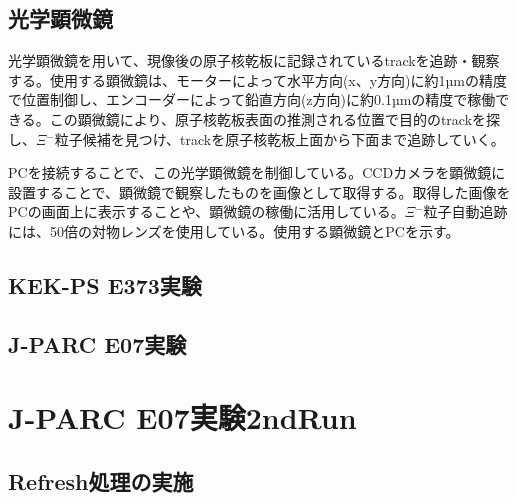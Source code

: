 \documentclass[12pt,a4paper]{jarticle}
\begin{document}
\subsection{光学顕微鏡}
光学顕微鏡を用いて、現像後の原子核乾板に記録されているtrackを追跡・観察する。使用する顕微鏡は、モーターによって水平方向(x、y方向)に約1µmの精度で位置制御し、エンコーダーによって鉛直方向(z方向)に約0.1µmの精度で稼働できる。この顕微鏡により、原子核乾板表面の推測される位置で目的のtrackを探し、$\Xi$$^-$粒子候補を見つけ、trackを原子核乾板上面から下面まで追跡していく。\par
PCを接続することで、この光学顕微鏡を制御している。CCDカメラを顕微鏡に設置することで、顕微鏡で観察したものを画像として取得する。取得した画像をPCの画面上に表示することや、顕微鏡の稼働に活用している。$\Xi$$^-$粒子自動追跡には、50倍の対物レンズを使用している。使用する顕微鏡とPCを示す。
\subsection{KEK-PS E373実験}
\subsection{J-PARC E07実験}


\newpage
\section{J-PARC E07実験2ndRun}
\subsection{Refresh処理の実施}
\end{document}
